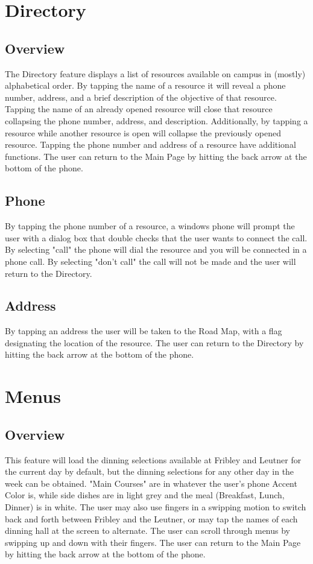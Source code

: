 \documentclass[pdftex,12pt,letter]{article}
\begin{document}
\section{Directory}
\subsection{Overview}
The Directory feature displays a list of resources available on campus in (mostly) alphabetical order. By tapping the name of a resource it will reveal a phone number, address, and a brief description of the objective of that resource. Tapping the name of an already opened resource will close that resource collapsing the phone number, address, and description. Additionally, by tapping a resource while another resource is open will collapse the previously opened resource. Tapping the phone number and address of a resource have additional functions. The user can return to the Main Page by hitting the back arrow at the bottom of the phone.
\subsection{Phone}
By tapping the phone number of a resource, a windows phone will prompt the user with a dialog box that double checks that the user wants to connect the call. By selecting "call" the phone will dial the resource and you will be connected in a phone call. By selecting "don't call" the call will not be made and the user will return to the Directory.
\subsection{Address}
By tapping an address the user will be taken to the Road Map, with a flag designating the location of the resource. The user can return to the Directory by hitting the back arrow at the bottom of the phone.

\section{Menus}
\subsection{Overview}
This feature will load the dinning selections available at Fribley and Leutner for the current day by default, but the dinning selections for any other day in the week can be obtained. "Main Courses" are in whatever the user's phone Accent Color is, while side dishes are in light grey and the meal (Breakfast, Lunch, Dinner) is in white. The user may also use fingers in a swipping motion to switch back and forth between Fribley and the Leutner, or may tap the names of each dinning hall at the screen to alternate. The user can scroll through menus by swipping up and down with their fingers. The user can return to the Main Page by hitting the back arrow at the bottom of the phone.
\end{document}
